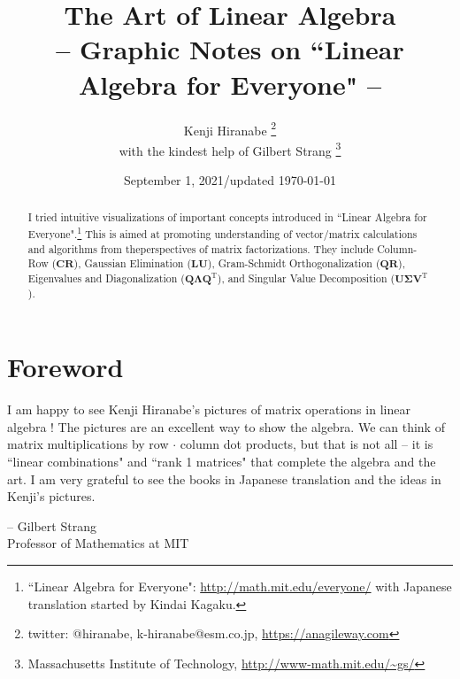 \documentclass[letterpaper]{article}
\DeclareRobustCommand\transp{^{\mathrm{T}}}
\begin{document}
\title{The Art of Linear Algebra\\
\vspace{5pt}
\large{
-- Graphic Notes on ``Linear Algebra for Everyone" --
}
}

\author{Kenji Hiranabe
\thanks{twitter: @hiranabe, k-hiranabe@esm.co.jp, \url{https://anagileway.com}} \\
with the kindest help of Gilbert Strang
\thanks{Massachusetts Institute of Technology, \url{http://www-math.mit.edu/\~gs/}}
}

\date{September 1, 2021/updated \today}

\maketitle

\vspace{-5pt}
 
\begin{abstract}
I tried intuitive visualizations of important concepts introduced
in ``Linear Algebra for Everyone".\footnote{``Linear Algebra for Everyone":
\url{http://math.mit.edu/everyone/} with Japanese translation started by Kindai Kagaku.}\linebreak
This is aimed at promoting understanding of vector/matrix calculations
and algorithms from the\linebreak perspectives of matrix factorizations.
They include Column-Row ($\bm{CR}$), Gaussian Elimination ($\bm{LU}$),
Gram-Schmidt Orthogonalization ($\bm{QR}$), Eigenvalues and Diagonalization ($\bm{Q \Lambda Q\transp}$),
and Singular Value Decomposition ($\bm{U \Sigma V\transp}$).
\end{abstract}

\section*{Foreword}
I am happy to see Kenji Hiranabe's pictures of matrix operations in linear algebra !
The pictures are an excellent way to show the algebra.  We can think of matrix
multiplications by row $\bm{\cdot}$ column dot products, but that is not all --  it is ``linear combinations"
and ``rank 1 matrices" that complete the algebra and the art.
I am very grateful to see the books in Japanese translation
and the ideas in Kenji's pictures.
\begin{flushright}
-- Gilbert Strang \\ Professor of Mathematics at MIT
\end{flushright}
\end{document}
